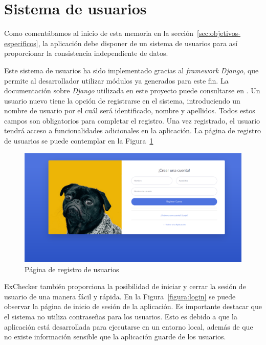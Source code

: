 \documentclass[a4paper, 12pt]{book}
\begin{document}
\section{Sistema de usuarios}
\label{sec:sistema_usuarios}

Como comentábamos al inicio de esta memoria en la
sección~\ref{sec:objetivos-especificos}, la aplicación debe disponer
de un sistema de usuarios para así proporcionar la consistencia
independiente de datos.

Este sistema de usuarios ha sido implementado gracias al \textit{framework} \textit{Django},
que permite al desarrollador utilizar módulos ya generados para este fin.
La documentación sobre \textit{Django} utilizada en este proyecto puede consultarse
en \cite{django:documentation}.
Un usuario nuevo tiene la opción de registrarse en el sistema, introduciendo
un nombre de usuario por el cuál será identificado, nombre y apellidos.
Todos estos campos son
obligatorios para completar el registro. Una vez registrado, el usuario
tendrá acceso a funcionalidades adicionales en la aplicación. La página
de registro de usuarios se puede contemplar en la
Figura~\ref{figura:registro}

\begin{figure}
  \centering
  \includegraphics[width=12cm, keepaspectratio]{img/registro}
  \caption{Página de registro de usuarios}
  \label{figura:registro}
\end{figure}

ExChecker también proporciona la posibilidad de iniciar y cerrar la sesión
de usuario de una manera fácil y rápida. En la 
Figura~\ref{figura:login} se puede observar la página de inicio
de sesión de la aplicación. Es importante destacar que el sistema no utiliza
contraseñas para los usuarios. Esto es debido a que la aplicación está
desarrollada para ejecutarse en un entorno local, además de que no existe
información sensible que la aplicación guarde de los usuarios.
\end{document}
